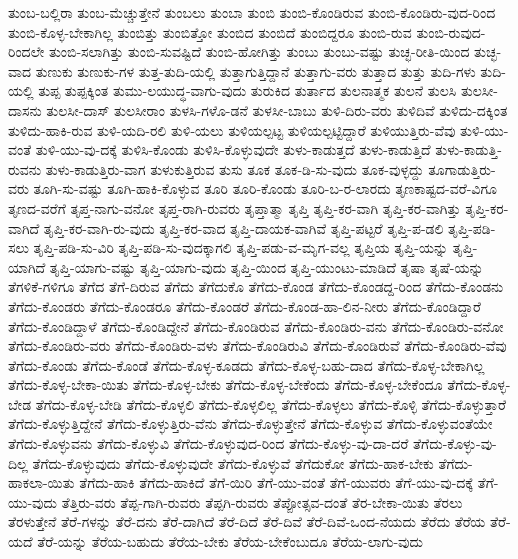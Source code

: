 {ತುಂಬ-ಬಲ್ಲಿರಾ
ತುಂಬ-ಮೆಚ್ಚುತ್ತೇನೆ
ತುಂಬಲು
ತುಂಬಾ
ತುಂಬಿ
ತುಂಬಿ-ಕೊಂಡಿರುವ
ತುಂಬಿ-ಕೊಂಡಿರು-ವುದ-ರಿಂದ
ತುಂಬಿ-ಕೊಳ್ಳ-ಬೇಕಾಗಿಲ್ಲ
ತುಂಬಿತ್ತು
ತುಂಬಿತ್ತೋ
ತುಂಬಿದ
ತುಂಬಿದೆ
ತುಂಬಿದ್ದರೂ
ತುಂಬಿ-ರುವ
ತುಂಬಿ-ರುವುದ-ರಿಂದಲೇ
ತುಂಬಿ-ಸಲಾಗಿತ್ತು
ತುಂಬಿ-ಸುವಷ್ಟಿದೆ
ತುಂಬಿ-ಹೋಗಿತ್ತು
ತುಂಬು
ತುಂಬು-ವಷ್ಟು
ತುಚ್ಛ-ರೀತಿ-ಯಿಂದ
ತುಚ್ಛ-ವಾದ
ತುಣುಕು
ತುಣುಕು-ಗಳ
ತುತ್ತ-ತುದಿ-ಯಲ್ಲಿ
ತುತ್ತಾಗುತ್ತಿದ್ದಾನೆ
ತುತ್ತಾಗು-ವರು
ತುತ್ತಾದ
ತುತ್ತು
ತುದಿ-ಗಳು
ತುದಿ-ಯಲ್ಲಿ
ತುಪ್ಪ
ತುಪ್ಪಕ್ಕಿಂತ
ತುಮು-ಲಯುದ್ಧ-ವಾಗು-ವುದು
ತುರುಕಿದ
ತುರ್ತಾದ
ತುಲನಾತ್ಮಕ
ತುಲನೆ
ತುಲಸಿ
ತುಲಸೀ-ದಾಸನು
ತುಲಸೀ-ದಾಸ್
ತುಲಸೀರಾಂ
ತುಳಸಿ-ಗಳೊ-ಡನೆ
ತುಳಸೀ-ಬಾಬು
ತುಳಿ-ದಿರು-ವರು
ತುಳಿದಿವೆ
ತುಳಿದು-ದಕ್ಕಿಂತ
ತುಳಿದು-ಹಾಕಿ-ರುವ
ತುಳಿ-ಯದಿ-ರಲಿ
ತುಳಿ-ಯಲು
ತುಳಿಯಲ್ಪಟ್ಟ
ತುಳಿಯಲ್ಪಟ್ಟಿದ್ದಾರೆ
ತುಳಿಯುತ್ತಿರು-ವೆವು
ತುಳಿ-ಯು-ವಂತೆ
ತುಳಿ-ಯು-ವು-ದಕ್ಕೆ
ತುಳಿಸಿ-ಕೊಂಡು
ತುಳಿಸಿ-ಕೊಳ್ಳುವುದೇ
ತುಳು-ಕಾಡುತ್ತದೆ
ತುಳು-ಕಾಡುತ್ತಿದೆ
ತುಳು-ಕಾಡುತ್ತಿ-ರುವನು
ತುಳು-ಕಾಡುತ್ತಿರು-ವಾಗ
ತುಳುಕುತ್ತಿರುವ
ತುಸು
ತೂಕ
ತೂಕ-ಡಿ-ಸು-ವುದು
ತೂಕ-ವುಳ್ಳದ್ದು
ತೂಗಾಡುತ್ತಿರು-ವರು
ತೂಗಿ-ಸು-ವಷ್ಟು
ತೂಗಿ-ಹಾಕಿ-ಕೊಳ್ಳುವ
ತೂರಿ
ತೂರಿ-ಕೊಂಡು
ತೂರಿ-ಬ-ರ-ಲಾರದು
ತೃಣಕಾಷ್ಟದ-ವರೆ-ವಿಗೂ
ತೃಣದ-ವರೆಗೆ
ತೃಪ್ತ-ನಾಗು-ವನೋ
ತೃಪ್ತ-ರಾಗಿ-ರುವರು
ತೃಪ್ತಾತ್ಮಾ
ತೃಪ್ತಿ
ತೃಪ್ತಿ-ಕರ-ವಾಗಿ
ತೃಪ್ತಿ-ಕರ-ವಾಗಿತ್ತು
ತೃಪ್ತಿ-ಕರ-ವಾಗಿದೆ
ತೃಪ್ತಿ-ಕರ-ವಾಗಿ-ರು-ವುದು
ತೃಪ್ತಿ-ಕರ-ವಾದ
ತೃಪ್ತಿ-ದಾಯಕ-ವಾಗಿವೆ
ತೃಪ್ತಿ-ಪಟ್ಟರೆ
ತೃಪ್ತಿ-ಪ-ಡಲಿ
ತೃಪ್ತಿ-ಪಡಿ-ಸಲು
ತೃಪ್ತಿ-ಪಡಿ-ಸು-ವಿರಿ
ತೃಪ್ತಿ-ಪಡಿ-ಸು-ವುದಕ್ಕಾಗಲಿ
ತೃಪ್ತಿ-ಪಡು-ವ-ಮೃಗ-ವಲ್ಲ
ತೃಪ್ತಿಯ
ತೃಪ್ತಿ-ಯನ್ನು
ತೃಪ್ತಿ-ಯಾಗಿದೆ
ತೃಪ್ತಿ-ಯಾಗು-ವಷ್ಟು
ತೃಪ್ತಿ-ಯಾಗು-ವುದು
ತೃಪ್ತಿ-ಯಿಂದ
ತೃಪ್ತಿ-ಯುಂಟು-ಮಾಡಿದೆ
ತೃಷಾ
ತೃಷೆ-ಯನ್ನು
ತೆಗಳಿಕೆ-ಗಳಿಗೂ
ತೆಗೆದ
ತೆಗೆ-ದಿರುವ
ತೆಗೆದು
ತೆಗೆದುಕೊ
ತೆಗೆದು-ಕೊಂಡ
ತೆಗೆದು-ಕೊಂಡದ್ದ-ರಿಂದ
ತೆಗೆದು-ಕೊಂಡನು
ತೆಗೆದು-ಕೊಂಡರು
ತೆಗೆದು-ಕೊಂಡರೂ
ತೆಗೆದು-ಕೊಂಡರೆ
ತೆಗೆದು-ಕೊಂಡ-ಹಾ-ಲಿನ-ನೀರು
ತೆಗೆದು-ಕೊಂಡಿದ್ದಾರೆ
ತೆಗೆದು-ಕೊಂಡಿದ್ದಾಳೆ
ತೆಗೆದು-ಕೊಂಡಿದ್ದೇನೆ
ತೆಗೆದು-ಕೊಂಡಿರುವ
ತೆಗೆದು-ಕೊಂಡಿರು-ವನು
ತೆಗೆದು-ಕೊಂಡಿರು-ವನೋ
ತೆಗೆದು-ಕೊಂಡಿರು-ವರು
ತೆಗೆದು-ಕೊಂಡಿರು-ವಳು
ತೆಗೆದು-ಕೊಂಡಿರುವಿ
ತೆಗೆದು-ಕೊಂಡಿರುವೆ
ತೆಗೆದು-ಕೊಂಡಿರು-ವೆವು
ತೆಗೆದು-ಕೊಂಡು
ತೆಗೆದು-ಕೊಂಡೆ
ತೆಗೆದು-ಕೊಳ್ಳ-ಕೂಡದು
ತೆಗೆದು-ಕೊಳ್ಳ-ಬಹು-ದಾದ
ತೆಗೆದು-ಕೊಳ್ಳ-ಬೇಕಾಗಿಲ್ಲ
ತೆಗೆದು-ಕೊಳ್ಳ-ಬೇಕಾ-ಯಿತು
ತೆಗೆದು-ಕೊಳ್ಳ-ಬೇಕು
ತೆಗೆದು-ಕೊಳ್ಳ-ಬೇಕೆಂದು
ತೆಗೆದು-ಕೊಳ್ಳ-ಬೇಕೆಂದೂ
ತೆಗೆದು-ಕೊಳ್ಳ-ಬೇಡ
ತೆಗೆದು-ಕೊಳ್ಳ-ಬೇಡಿ
ತೆಗೆದು-ಕೊಳ್ಳಲಿ
ತೆಗೆದು-ಕೊಳ್ಳಲಿಲ್ಲ
ತೆಗೆದು-ಕೊಳ್ಳಲು
ತೆಗೆದು-ಕೊಳ್ಳಿ
ತೆಗೆದು-ಕೊಳ್ಳುತ್ತಾರೆ
ತೆಗೆದು-ಕೊಳ್ಳುತ್ತಿದ್ದೇನೆ
ತೆಗೆದು-ಕೊಳ್ಳುತ್ತಿರು-ವೆನು
ತೆಗೆದು-ಕೊಳ್ಳುತ್ತೇನೆ
ತೆಗೆದು-ಕೊಳ್ಳುವ
ತೆಗೆದು-ಕೊಳ್ಳುವಂತೆಯೇ
ತೆಗೆದು-ಕೊಳ್ಳುವನು
ತೆಗೆದು-ಕೊಳ್ಳುವಿ
ತೆಗೆದು-ಕೊಳ್ಳುವುದ-ರಿಂದ
ತೆಗೆದು-ಕೊಳ್ಳು-ವು-ದಾ-ದರೆ
ತೆಗೆದು-ಕೊಳ್ಳು-ವು-ದಿಲ್ಲ
ತೆಗೆದು-ಕೊಳ್ಳುವುದು
ತೆಗೆದು-ಕೊಳ್ಳುವುದೇ
ತೆಗೆದು-ಕೊಳ್ಳುವೆ
ತೆಗೆದುಕೋ
ತೆಗೆದು-ಹಾಕ-ಬೇಕು
ತೆಗೆದು-ಹಾಕಲಾ-ಯಿತು
ತೆಗೆದು-ಹಾಕಿ
ತೆಗೆದು-ಹಾಕಿದೆ
ತೆಗೆ-ಯಿರಿ
ತೆಗೆ-ಯು-ವಂತೆ
ತೆಗೆ-ಯುವರು
ತೆಗೆ-ಯು-ವು-ದಕ್ಕೆ
ತೆಗೆ-ಯು-ವುದು
ತೆತ್ತಿರು-ವರು
ತೆಪ್ಪ-ಗಾಗಿ-ರುವರು
ತೆಪ್ಪಗಿ-ರುವರು
ತೆಪ್ಪೋತ್ಸವ-ದಂತೆ
ತೆರ-ಬೇಕಾ-ಯಿತು
ತೆರಲು
ತೆರಳುತ್ತೇನೆ
ತೆರೆ-ಗಳನ್ನು
ತೆರೆ-ದನು
ತೆರೆ-ದಾಗಿದೆ
ತೆರೆ-ದಿದೆ
ತೆರೆ-ದಿವೆ
ತೆರೆ-ದಿವೆ-ಒಂದ-ನೆಯದು
ತೆರೆದು
ತೆರೆಯ
ತೆರೆ-ಯದೆ
ತೆರೆ-ಯನ್ನು
ತೆರೆಯ-ಬಹುದು
ತೆರೆಯ-ಬೇಕು
ತೆರೆಯ-ಬೇಕೆಂಬುದೂ
ತೆರೆಯ-ಲಾಗು-ವುದು
}
